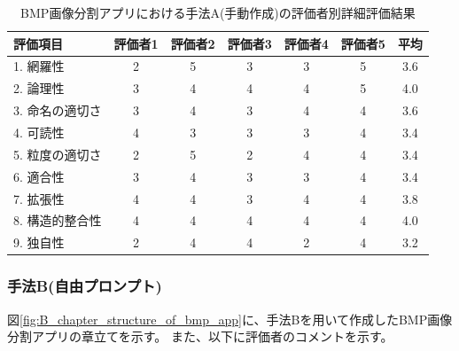 \begin{table}[tp]
  \caption{BMP画像分割アプリにおける手法A(手動作成)の評価者別詳細評価結果}
  \label{tb:detailed_evaluation_results_A}
  \centering
  \begin{tabular}{|l|c|c|c|c|c|c|}
    \hline
    \textbf{評価項目} & \textbf{評価者1} & \textbf{評価者2} & \textbf{評価者3} & \textbf{評価者4} & \textbf{評価者5} & \textbf{平均} \\
    \hline\hline
    1. 網羅性 & 2 & 5 & 3 & 3 & 5 & 3.6 \\
    \hline
    2. 論理性 & 3 & 4 & 4 & 4 & 5 & 4.0 \\
    \hline
    3. 命名の適切さ & 3 & 4 & 3 & 4 & 4 & 3.6 \\
    \hline
    4. 可読性 & 4 & 3 & 3 & 3 & 4 & 3.4 \\
    \hline
    5. 粒度の適切さ & 2 & 5 & 2 & 4 & 4 & 3.4 \\
    \hline
    6. 適合性 & 3 & 4 & 3 & 3 & 4 & 3.4 \\
    \hline
    7. 拡張性 & 4 & 4 & 3 & 4 & 4 & 3.8 \\
    \hline
    8. 構造的整合性 & 4 & 4 & 4 & 4 & 4 & 4.0 \\
    \hline
    9. 独自性 & 2 & 4 & 4 & 2 & 4 & 3.2 \\
    \hline
  \end{tabular}
\end{table}



\subsubsection{手法B(自由プロンプト)}


図\ref{fig:B_chapter_structure_of_bmp_app}に、手法Bを用いて作成したBMP画像分割アプリの章立てを示す。
また、以下に評価者のコメントを示す。

